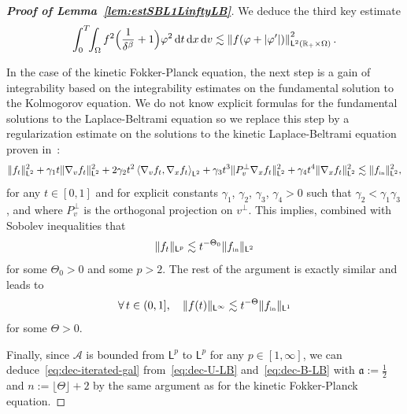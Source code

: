 \documentclass[11pt]{amsart}
\theoremstyle{definition}
\theoremstyle{remark}
\numberwithin{equation}{section}
\newcommand\R{{\mathbb R}}
\def\AA{{\mathcal A}}
\newcommand{\dd}{{\, \mathrm d}}
\newcommand{\init}{\text{{\tiny {\rm in}}}}
\newcommand{\sfL}{\mathsf{L}}
\begin{document}
\begin{proof}[{\bf Proof of Lemma~\ref{lem:estSBL1LinftyLB}}]
    We deduce the third key estimate 
    \begin{eqnarray*}
      \int_0^T\!\!\int_\Omega  f^2 \Bigl( \frac{1}{\delta^{\beta}} +  1  \Bigr)  \varphi^2 \dd t \dd x \dd v 
      \lesssim \left\| f (\varphi + |\varphi'|) \right\|^2 _{\sfL^2(\R_+ \times \Omega)}.
    \end{eqnarray*}
    
    In the case of the kinetic Fokker-Planck equation, the next step is a gain of integrability based on the integrability estimates on the fundamental solution to the Kolmogorov equation. We do not know explicit formulas for the fundamental solutions to the Laplace-Beltrami equation so we replace this step by a regularization estimate on the solutions to the kinetic Laplace-Beltrami equation proven in~\cite[Proposition~4.7]{Bouin_Frouvelle}:
    \begin{equation*}
      \Vert f_t \Vert_{\sfL^2} ^2 + \gamma_1 t \Vert\nabla_v f_t \Vert_{\sfL^2}^2+2 \gamma_2 t ^2\left\langle\nabla_v f_t, \nabla_x f_t\right\rangle_{\sfL^2} 
      + \gamma_3 t ^3\Vert P_{v}^\perp\nabla_x f_t\Vert^2_{\sfL^2}+ \gamma_4 t ^4\Vert\nabla_x f_t\Vert_{\sfL^2}^2 \lesssim\Vert f_\init \Vert_{\sfL^2}^2,
    \end{equation*}
    for any $t \in [0,1]$ and for explicit constants $\gamma_1$, $\gamma_2$, $\gamma_3$, $\gamma_4 > 0$ such that $\gamma_2 < \gamma_1 \gamma_3$, and where $P_v^\perp$ is the orthogonal projection on $v^\perp$. This implies, combined with Sobolev inequalities that
    \begin{equation*}
      \Vert f_t \Vert_{\sfL^p} \lesssim t^{-\Theta_0} \Vert f_\init \Vert_{\sfL^2}
    \end{equation*}
    for some $\Theta_0>0$ and some $p>2$. The rest of the argument is exactly similar and leads to
    \begin{equation*}
      \forall \, t \in (0,1], \quad \| f (t) \|_{\sfL^\infty}   \lesssim t^{-\Theta} \| f_\init \|_{\sfL^{1}}
    \end{equation*}
    for some $\Theta>0$.
    
    Finally, since $\AA$ is bounded from $\sfL^p$ to $\sfL^p$ for any $p \in [1,\infty]$, we can deduce~\eqref{eq:dec-iterated-gal} from~\eqref{eq:dec-U-LB} and~\eqref{eq:dec-B-LB} with $\mathfrak a := \frac{1}{2}$ and $n := \lfloor  \Theta \rfloor + 2$ by the same argument as for the kinetic Fokker-Planck equation.
\end{proof}
\end{document}
